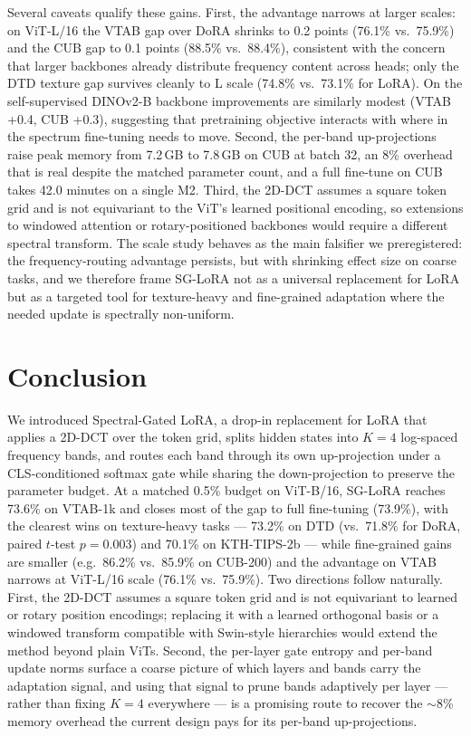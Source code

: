 \documentclass{article}
\begin{document}
Several caveats qualify these gains. First, the advantage narrows at larger scales: on ViT-L/16 \citep{dosovitskiy2021vit} the VTAB gap over DoRA shrinks to 0.2 points (76.1\% vs.\ 75.9\%) and the CUB gap to 0.1 points (88.5\% vs.\ 88.4\%), consistent with the concern that larger backbones already distribute frequency content across heads; only the DTD texture gap survives cleanly to L scale (74.8\% vs.\ 73.1\% for LoRA). On the self-supervised DINOv2-B backbone \citep{oquab2024dinov2} improvements are similarly modest (VTAB +0.4, CUB +0.3), suggesting that pretraining objective interacts with where in the spectrum fine-tuning needs to move. Second, the per-band up-projections raise peak memory from 7.2\,GB to 7.8\,GB on CUB at batch 32, an 8\% overhead that is real despite the matched parameter count, and a full fine-tune on CUB takes 42.0 minutes on a single M2. Third, the 2D-DCT assumes a square token grid and is not equivariant to the ViT's learned positional encoding, so extensions to windowed attention \citep{liu2021swin} or rotary-positioned backbones would require a different spectral transform. The scale study behaves as the main falsifier we preregistered: the frequency-routing advantage persists, but with shrinking effect size on coarse tasks, and we therefore frame SG-LoRA not as a universal replacement for LoRA but as a targeted tool for texture-heavy and fine-grained adaptation where the needed update is spectrally non-uniform.

\section{Conclusion}
We introduced Spectral-Gated LoRA, a drop-in replacement for LoRA that applies a 2D-DCT over the token grid, splits hidden states into $K{=}4$ log-spaced frequency bands, and routes each band through its own up-projection under a CLS-conditioned softmax gate while sharing the down-projection to preserve the parameter budget. At a matched 0.5\% budget on ViT-B/16, SG-LoRA reaches 73.6\% on VTAB-1k and closes most of the gap to full fine-tuning (73.9\%), with the clearest wins on texture-heavy tasks — 73.2\% on DTD (vs.\ 71.8\% for DoRA, paired $t$-test $p{=}0.003$) and 70.1\% on KTH-TIPS-2b — while fine-grained gains are smaller (e.g.\ 86.2\% vs.\ 85.9\% on CUB-200) and the advantage on VTAB narrows at ViT-L/16 scale (76.1\% vs.\ 75.9\%). Two directions follow naturally. First, the 2D-DCT assumes a square token grid and is not equivariant to learned or rotary position encodings; replacing it with a learned orthogonal basis or a windowed transform compatible with Swin-style hierarchies would extend the method beyond plain ViTs. Second, the per-layer gate entropy and per-band update norms surface a coarse picture of which layers and bands carry the adaptation signal, and using that signal to prune bands adaptively per layer — rather than fixing $K{=}4$ everywhere — is a promising route to recover the $\sim$8\% memory overhead the current design pays for its per-band up-projections.



\end{document}
